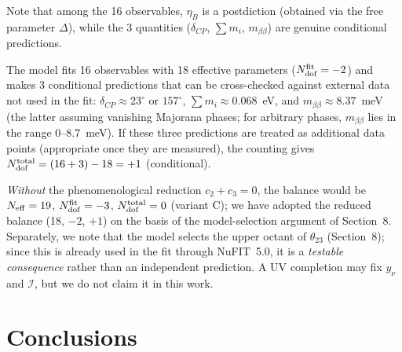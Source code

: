 \documentclass[12pt,a4paper]{article}
\numberwithin{equation}{section}
\begin{document}
Note that among the 16 observables, \(\eta_B\) is a postdiction (obtained via the free parameter \(\Delta\)), while the 3 quantities (\(\delta_{CP}\), \(\sum m_i\), \(m_{\beta\beta}\)) are genuine conditional predictions.

The model fits 16 observables with 18 effective parameters
(\(N_{\rm dof}^{\rm fit} = -2\)) and makes 3 conditional predictions
that can be cross-checked against external data not used in the fit:
\(\delta_{CP} \approx 23^\circ\) or \(157^\circ\),
\(\sum m_i \approx 0.068\)~eV, and
\(m_{\beta\beta} \approx 8.37\)~meV (the latter assuming vanishing
Majorana phases; for arbitrary phases, \(m_{\beta\beta}\) lies in the
range \(0\)--\(8.7\)~meV). If these three predictions are treated as
additional data points (appropriate once they are measured), the
counting gives \(N_{\rm dof}^{\rm total} = (16+3) - 18 = +1\) (conditional).

\emph{Without} the phenomenological reduction \(c_2 + c_3 = 0\),
the balance would be \(N_{\rm eff} = 19\),
\(N_{\rm dof}^{\rm fit} = -3\), \(N_{\rm dof}^{\rm total} = 0\)
(variant C); we have adopted the reduced balance
(18, \(-2\), \(+1\)) on the basis of the model-selection argument of
Section~8. Separately, we note that the model selects the upper
octant of \(\theta_{23}\) (Section~8); since this is already used in
the fit through NuFIT~5.0, it is a \emph{testable consequence} rather
than an independent prediction. A UV completion may fix \(y_\nu\) and
\(\mathcal{I}\), but we do not claim it in this work.

\section{Conclusions}
\end{document}
